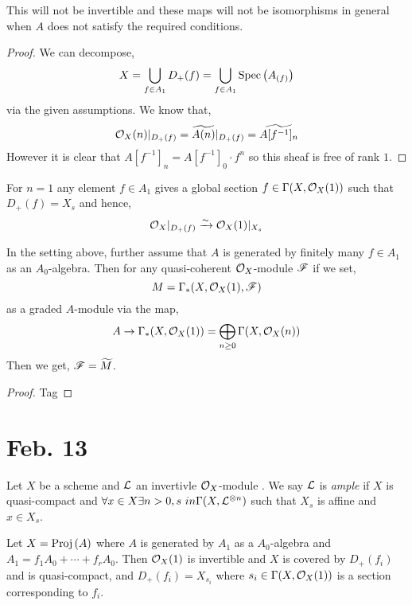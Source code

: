 \documentclass[12pt]{article}
\begin{document}
\begin{remark}
This will not be invertible and these maps will not be isomorphisms in general when $A$ does not satisfy the required conditions.
\end{remark}

\begin{proof}
We can decompose,
\[ X = \bigcup_{f \in A_1} D_{+}(f) = \bigcup_{f \in A_1}  \mathrm{Spec}\left( A_{(f)} \right) \]
via the given assumptions. We know that,
\[ \mathcal{O}_{X}(n) |_{D_+(f)} = \widetilde{A(n)} |_{D_+(f)} = \widetilde{A[f^{-1}]_{n}} \]
However it is clear that $A[f^{-1}]_{n} = A[f^{-1}]_{0} \cdot f^n$ so this sheaf is free of rank $1$. 
\end{proof}

\begin{remark}
For $n = 1$ any element $f \in A_1$ gives a global section $f \in \Gamma(X, \mathcal{O}_{X}(1))$ such that $D_{+}(f) = X_s$ and hence,
\[ \mathcal{O}_{X}|_{D_+(f)} \xrightarrow{\sim} \mathcal{O}_{X}(1)|_{X_s} \]\end{remark}

\begin{corollary}
In the setting above, further assume that $A$ is generated by finitely many $f \in A_1$ as an $A_0$-algebra. Then for any quasi-coherent $\mathcal{O}_{X}$-module $\mathscr{F}$ if we set,
\[ M = \Gamma_*(X, \mathcal{O}_{X}(1), \mathscr{F}) \]
as a graded $A$-module via the map,
\[ A \to \Gamma_*(X, \mathcal{O}_{X}(1)) = \bigoplus_{n \ge 0} \Gamma(X, \mathcal{O}_{X}(n)) \]
Then we get, $\mathscr{F} = \widetilde{M}$. 
\end{corollary}

\begin{proof}
Tag 
\end{proof}

\section{Feb. 13}


\begin{definition}
Let $X$ be a scheme and $\mathcal{L}$ an invertivle $\mathcal{O}_{X}$-module . We say $\mathcal{L}$ is \textit{ample} if $X$ is quasi-compact and $\forall x \in X \exists n > 0, s\ in \Gamma(X, \mathcal{L}^{\otimes n})$ such that $X_{s}$ is affine and $x \in X_s$. 
\end{definition}

\begin{example}
Let $X = \mathrm{Proj}\left( A \right)$ where $A$ is generated by $A_1$ as a $A_0$-algebra and $A_1 = f_1 A_0 + \cdots + f_r A_0$. Then $\mathcal{O}_{X}(1)$ is invertible and $X$ is covered by $D_{+}(f_i)$ and is quasi-compact, and $D_+(f_i) = X_{s_i}$ where $s_i \in \Gamma(X, \mathcal{O}_{X}(1))$ is a section corresponding to $f_i$. 
\end{example}
\end{document}
